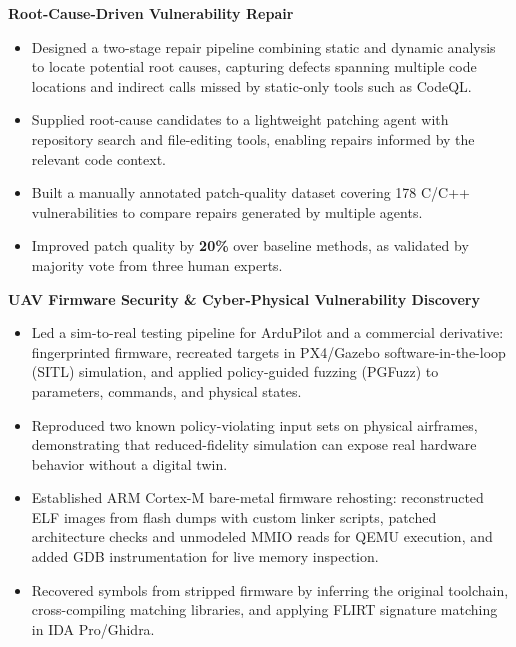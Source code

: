 \documentclass{resume}
\newcommand{\project}[1]{\par\addvspace{0.7ex}\Needspace{4\baselineskip}\textbf{#1}\par}
\begin{document}
\project{Root-Cause-Driven Vulnerability Repair}
\begin{itemize}
\item Designed a two-stage repair pipeline combining static and dynamic analysis to locate potential root causes, capturing defects spanning multiple code locations and indirect calls missed by static-only tools such as CodeQL.
\item Supplied root-cause candidates to a lightweight patching agent with repository search and file-editing tools, enabling repairs informed by the relevant code context.
\item Built a manually annotated patch-quality dataset covering 178 C/C++ vulnerabilities to compare repairs generated by multiple agents.
\item Improved patch quality by \textbf{20\%} over baseline methods, as validated by majority vote from three human experts.
\end{itemize}

\project{UAV Firmware Security \& Cyber-Physical Vulnerability Discovery}
\begin{itemize}
\item Led a sim-to-real testing pipeline for ArduPilot and a commercial derivative: fingerprinted firmware, recreated targets in PX4/Gazebo software-in-the-loop (SITL) simulation, and applied policy-guided fuzzing (PGFuzz) to parameters, commands, and physical states.
\item Reproduced two known policy-violating input sets on physical airframes, demonstrating that reduced-fidelity simulation can expose real hardware behavior without a digital twin.
\item Established ARM Cortex-M bare-metal firmware rehosting: reconstructed ELF images from flash dumps with custom linker scripts, patched architecture checks and unmodeled MMIO reads for QEMU execution, and added GDB instrumentation for live memory inspection.
\item Recovered symbols from stripped firmware by inferring the original toolchain, cross-compiling matching libraries, and applying FLIRT signature matching in IDA Pro/Ghidra.
\end{itemize}
\end{document}
